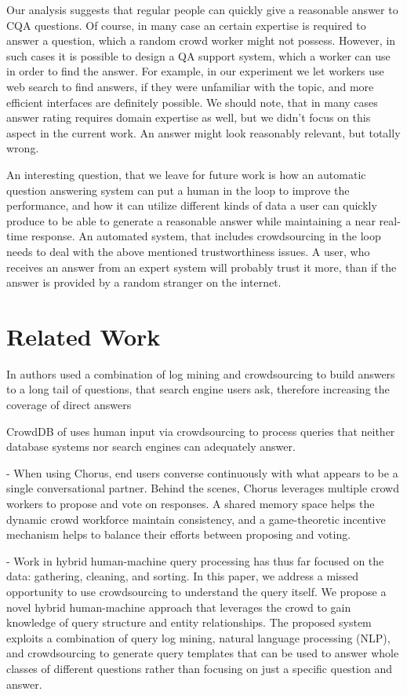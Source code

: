\documentclass[11pt,letterpaper]{article}
\begin{document}
Our analysis suggests that regular people can quickly give a reasonable answer to CQA questions.
Of course, in many case an certain expertise is required to answer a question, which a random crowd worker might not possess.
However, in such cases it is possible to design a QA support system, which a worker can use in order to find the answer.
For example, in our experiment we let workers use web search to find answers, if they were unfamiliar with the topic, and more efficient interfaces are definitely possible.
We should note, that in many cases answer rating requires domain expertise as well, but we didn't focus on this aspect in the current work.
An answer might look reasonably relevant, but totally wrong.

An interesting question, that we leave for future work is how an automatic question answering system can put a human in the loop to improve the performance, and how it can utilize different kinds of data a user can quickly produce to be able to generate a reasonable answer while maintaining a near real-time response.
An automated system, that includes crowdsourcing in the loop needs to deal with the above mentioned trustworthiness issues.
A user, who receives an answer from an expert system will probably trust it more, than if the answer is provided by a random stranger on the internet.


\section{Related Work}
\label{sec:related_work}

In \cite{bernstein2012direct} authors used a combination of log mining and crowdsourcing to build answers to a long tail of questions, that search engine users ask, therefore increasing the coverage of direct answers

CrowdDB of \cite{franklin2011crowddb} uses human input via crowdsourcing
to process queries that neither database systems nor search engines
can adequately answer.

\cite{Lasecki:2013:CCC:2501988.2502057} - When using Chorus, end users converse continuously with what appears to be a single conversational partner. Behind the scenes, Chorus leverages multiple crowd workers to propose and vote on responses. A shared memory space helps the dynamic crowd workforce maintain consistency, and a game-theoretic incentive mechanism helps to balance their efforts between proposing and voting.

\cite{demartini2013crowdq} - Work in hybrid human-machine query processing has thus far focused on the data: gathering, cleaning, and sorting. In
this paper, we address a missed opportunity to use crowdsourcing
to understand the query itself. We propose a novel
hybrid human-machine approach that leverages the crowd
to gain knowledge of query structure and entity relationships.
The proposed system exploits a combination of query
log mining, natural language processing (NLP), and crowdsourcing
to generate query templates that can be used to
answer whole classes of different questions rather than focusing
on just a specific question and answer.
\end{document}
